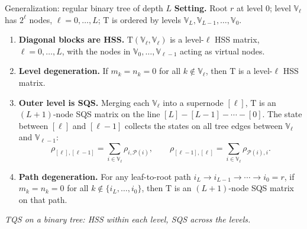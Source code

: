 \documentclass[aspectratio=169,11pt]{beamer}
\begin{document}
\begin{frame}{Generalization: regular binary tree of depth $L$}
\footnotesize
\textbf{Setting.} Root $r$ at level $0$; level $\mathbb{V}_\ell$ has $2^\ell$ nodes, $\ell=0,\dots,L$;
$\mathrm{T}$ is ordered by levels $\mathbb{V}_L,\mathbb{V}_{L-1},\dots,\mathbb{V}_0$.

\vspace{3mm}
\begin{enumerate}
\setlength{\itemsep}{2mm}
\item \textbf{Diagonal blocks are HSS.} $\mathrm{T}(\mathbb{V}_\ell,\mathbb{V}_\ell)$ is a level-$\ell$ HSS matrix,
  $\ell=0,\dots,L$, with the nodes in $\mathbb{V}_0,\dots,\mathbb{V}_{\ell-1}$ acting as virtual nodes.
\item \textbf{Level degeneration.} If $m_k=n_k=0$ for all $k\notin\mathbb{V}_\ell$,
  then $\mathrm{T}$ is a level-$\ell$ HSS matrix.
\item \textbf{Outer level is SQS.} Merging each $\mathbb{V}_\ell$ into a supernode $[\ell]$, $\mathrm{T}$ is an
  $(L+1)$-node SQS matrix on the line $[L] - [L-1] - \cdots - [0]$. The state between $[\ell]$ and $[\ell-1]$
  collects the states on all tree edges between $\mathbb{V}_\ell$ and $\mathbb{V}_{\ell-1}$:
  \[ \rho_{[\ell],[\ell-1]}=\sum_{i\in\mathbb{V}_\ell}\rho_{i,\mathcal{P}(i)},
     \qquad \rho_{[\ell-1],[\ell]}=\sum_{i\in\mathbb{V}_\ell}\rho_{\mathcal{P}(i),i}. \]
\item \textbf{Path degeneration.} For any leaf-to-root path $i_L\to i_{L-1}\to\cdots\to i_0=r$, if $m_k=n_k=0$
  for all $k\notin\{i_L,\dots,i_0\}$, then $\mathrm{T}$ is an $(L+1)$-node SQS matrix on that path.
\end{enumerate}

\vspace{3mm}
\centering
\textit{TQS on a binary tree: HSS within each level, SQS across the levels.}
\end{frame}
\end{document}
